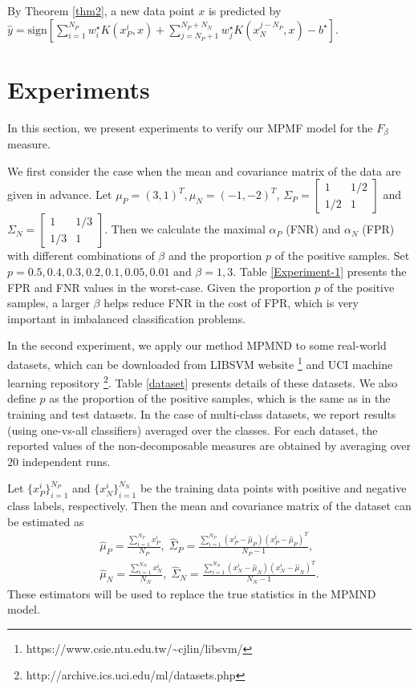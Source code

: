 \documentclass[15pt]{article}
\newcommand{\ben}{\begin{eqnarray*}}
\newcommand{\enn}{\end{eqnarray*}}
\begin{document}
By Theorem \ref{thm2}, a new data point $x$ is predicted by
$\hat y=\mbox{sign}\left[\sum\limits_{i=1}^{N_P}w^\star_{i}K(x_P^i,x)
+\sum\limits_{j=N_P+1}^{N_P+N_N}w^\star_{j}K(x_N^{j-N_P},x)-b^\star\right]$.



\section{Experiments}\label{sec6}


In this section, we present experiments to verify our MPMF model for the $F_\beta$ measure.

We first consider the case when the mean and covariance matrix of the data are given in advance.
Let $\mu_P=(3,1)^T,\mu_N=(-1,-2)^T$,
$\Sigma_P=\begin{bmatrix}
1& 1/2 \\
1/2 & 1
\end{bmatrix}$ and $\Sigma_N =\begin{bmatrix}
1& 1/3 \\
1/3 & 1
\end{bmatrix}$.
Then we calculate the maximal $\alpha_P$ (FNR) and $\alpha_N$ (FPR) with different combinations of $\beta$
and the proportion $p$ of the positive samples. Set $p=0.5,0.4,0.3,0.2,0.1,0.05,0.01$ and $\beta=1,3$.
Table \ref{Experiment-1} presents the FPR and FNR values in the worst-case.
Given the proportion $p$ of the positive samples, a larger $\beta$ helps reduce FNR in the cost of FPR, 
which is very important in imbalanced classification problems.

In the second experiment, we apply our method MPMND to some real-world datasets,
which can be downloaded from LIBSVM website \footnote{https://www.csie.ntu.edu.tw/\textasciitilde cjlin/libsvm/}
and UCI machine learning repository \footnote{http://archive.ics.uci.edu/ml/datasets.php}.
Table \ref{dataset} presents details of these datasets.
We also define $p$ as the proportion of the positive samples, which is the same as in the training and test datasets.
In the case of multi-class datasets, we report results (using one-vs-all classifiers) averaged over the classes.
For each dataset, the reported values of the non-decomposable measures are obtained by averaging over $20$ independent runs.

Let $\{x_P^i\}_{i=1}^{N_P}$ and $\{x_N^i\}_{i=1}^{N_N}$ be the training data points with positive and
negative class labels, respectively. Then the mean and covariance matrix of the dataset can be estimated as
\ben
\hat\mu_P=\frac{\sum_{i=1}^{N_P} x_P^i}{N_P},\;
\hat\Sigma_P=\frac{\sum_{i=1}^{N_P}(x_P^i-\hat\mu_P)(x_P^i-\hat\mu_P)^T}{N_P-1},\\
\hat\mu_N=\frac{\sum_{i=1}^{N_N} x_N^i}{N_N},\;
\hat\Sigma_N=\frac{\sum_{i=1}^{N_N}(x_N^i-\hat\mu_N)(x_N^i-\hat \mu_N)^T}{N_N-1}.
\enn
These estimators will be used to replace the true statistics in the MPMND model.
\end{document}
